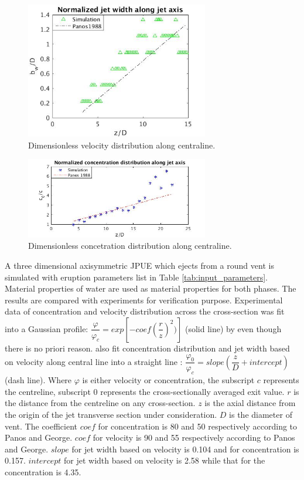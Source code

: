 \documentclass[journal abbreviation, manuscript]{copernicus}
\begin{document}
\begin{figure}
\includegraphics[width=8cm]{velo_along_axis}
\caption{Dimensionless velocity distribution along centraline.}
\label{fig:JPUE_along-axis_vel}
\end{figure}
\begin{figure}
\includegraphics[width=8cm]{conc_along_axis}
\caption{Dimensionless concetration distribution along centraline.}
\label{fig:JPUE_along-axis_conc}
\end{figure}

A three dimensional axisymmetric JPUE which ejects from a round vent is simulated with eruption parameters list in Table \ref{tab:input_parameters}. Material properties of water are used as material properties for both phases. The results are compared with experiments \citep {george1977turbulence, papanicolaou1988investigations} for verification purpose. Experimental data of concentration and velocity distribution across the cross-section was fit into a Gaussian profile: $\dfrac{\varphi}{\varphi_c}=exp[-coef (\dfrac{r}{z})^2)]$ (solid line) by \citet{papanicolaou1988investigations} even though there is no priori reason. \citet{papanicolaou1988investigations} also fit concentration distribution and jet width based on velocity along central line into a straight line : $\dfrac{\varphi_0}{\varphi_c}=slope (\dfrac{z}{D} + intercept)$ (dash line). Where $\varphi$ is either velocity or concentration, the subscript $c$ represents the centreline, subscript $0$ represents the cross-sectionally averaged exit value. $r$ is the distance from the centreline on any cross-section. $z$ is the axial distance from the origin of the jet transverse section under consideration. $D$ is the diameter of vent. 
The coefficient $coef$ for concentration is 80 and 50 respectively according to Panos and George. $coef$ for velocity is 90 and 55 respectively according to Panos and George. 
$slope$ for jet width based on velocity is 0.104 and for concentration is 0.157. $intercept$ for jet width based on velocity is 2.58 while that for the concentration is 4.35.
\end{document}
